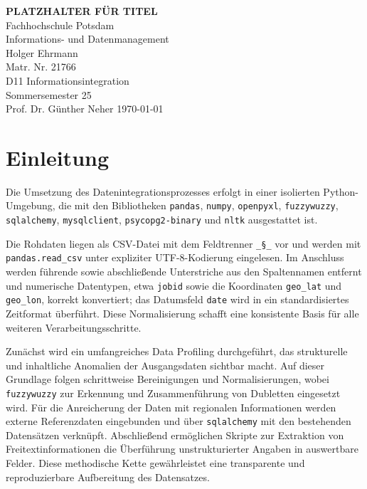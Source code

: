 \documentclass[
    a4paper,
    12pt,
    headinclude=true,
    BCOR=10mm,
]{scrreprt}
\begin{document}
\begin{titlepage}
    \centering
    \vspace*{1cm}
    \Large{\textbf{PLATZHALTER FÜR TITEL}}\\
    \vspace{1.5cm}
    \Large{Fachhochschule Potsdam}\\
    \vspace{0.5cm}
    \large{Informations- und Datenmanagement}\\
    \vspace{1.5cm}
    Holger Ehrmann\\
    Matr. Nr. 21766\\
    \vspace{1cm}
    D11 Informationsintegration\\
    Sommersemester 25\\
    Prof. Dr. Günther Neher
    \vfill
    \today
\end{titlepage}
\setcounter{tocdepth}{1}
\begingroup
{} %
{\small \tableofcontents}
\endgroup

\chapter{Einleitung}

Die Umsetzung des Datenintegrationsprozesses erfolgt in einer isolierten Python-Umgebung, die mit den Bibliotheken \texttt{pandas}, \texttt{numpy}, \texttt{openpyxl}, \texttt{fuzzywuzzy}, \texttt{sqlalchemy}, \texttt{mysqlclient}, \texttt{psycopg2-binary} und \texttt{nltk} ausgestattet ist.

Die Rohdaten liegen als CSV-Datei mit dem Feldtrenner \texttt{\_§\_} vor und werden mit \texttt{pandas.read\_csv} unter expliziter UTF-8-Kodierung eingelesen. Im Anschluss werden führende sowie abschließende Unterstriche aus den Spaltennamen entfernt und numerische Datentypen, etwa \texttt{jobid} sowie die Koordinaten \texttt{geo\_lat} und \texttt{geo\_lon}, korrekt konvertiert; das Datumsfeld \texttt{date} wird in ein standardisiertes Zeitformat überführt. Diese Normalisierung schafft eine konsistente Basis für alle weiteren Verarbeitungsschritte.

Zunächst wird ein umfangreiches Data Profiling durchgeführt, das strukturelle und inhaltliche Anomalien der Ausgangsdaten sichtbar macht. Auf dieser Grundlage folgen schrittweise Bereinigungen und Normalisierungen, wobei \texttt{fuzzywuzzy} zur Erkennung und Zusammenführung von Dubletten eingesetzt wird. Für die Anreicherung der Daten mit regionalen Informationen werden externe Referenzdaten eingebunden und über \texttt{sqlalchemy} mit den bestehenden Datensätzen verknüpft. Abschließend ermöglichen Skripte zur Extraktion von Freitextinformationen die Überführung unstrukturierter Angaben in auswertbare Felder. Diese methodische Kette gewährleistet eine transparente und reproduzierbare Aufbereitung des Datensatzes.
\end{document}
